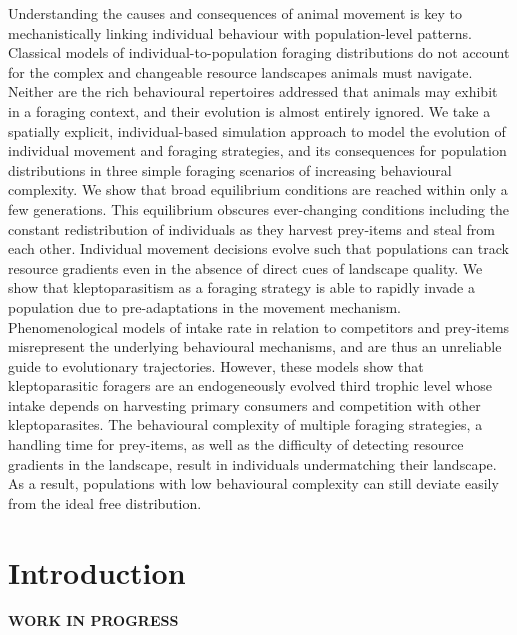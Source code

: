 \documentclass[11pt]{article}
\begin{document}
Understanding the causes and consequences of animal movement is key to mechanistically linking individual behaviour with population-level patterns.
Classical models of individual-to-population foraging distributions do not account for the complex and changeable resource landscapes animals must navigate.
Neither are the rich behavioural repertoires addressed that animals may exhibit in a foraging context, and their evolution is almost entirely ignored.
We take a spatially explicit, individual-based simulation approach to model the evolution of individual movement and foraging strategies, and its consequences for population distributions in three simple foraging scenarios of increasing behavioural complexity.
We show that broad equilibrium conditions are reached within only a few generations.
This equilibrium obscures ever-changing conditions including the constant redistribution of individuals as they harvest prey-items and steal from each other.
Individual movement decisions evolve such that populations can track resource gradients even in the absence of direct cues of landscape quality.
We show that kleptoparasitism as a foraging strategy is able to rapidly invade a population due to pre-adaptations in the movement mechanism.
Phenomenological models of intake rate in relation to competitors and prey-items misrepresent the underlying behavioural mechanisms, and are thus an unreliable guide to evolutionary trajectories.
However, these models show that kleptoparasitic foragers are an endogeneously evolved third trophic level whose intake depends on harvesting primary consumers and competition with other kleptoparasites.
The behavioural complexity of multiple foraging strategies, a handling time for prey-items, as well as the difficulty of detecting resource gradients in the landscape, result in individuals undermatching their landscape.
As a result, populations with low behavioural complexity can still deviate easily from the ideal free distribution.

\newpage{}

\section{Introduction}

\textbf{WORK IN PROGRESS}

\end{document}

